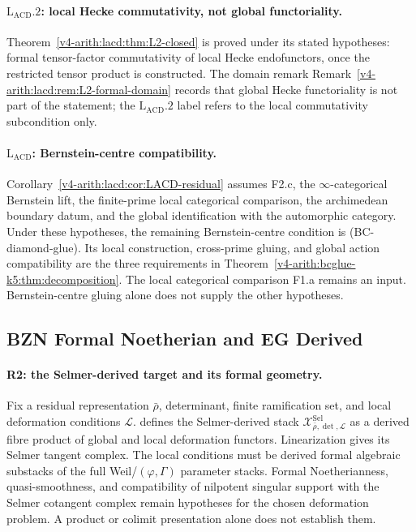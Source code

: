 \paragraph{\(\mathrm{L}_{\mathrm{ACD}}.2\): local Hecke commutativity, not global functoriality.}
Theorem~\ref{v4-arith:lacd:thm:L2-closed} is proved under its stated hypotheses: formal
tensor-factor commutativity of local Hecke endofunctors, once the
restricted tensor product is constructed. The domain remark
Remark~\ref{v4-arith:lacd:rem:L2-formal-domain} records that global Hecke
functoriality is not part of the statement; the
\(\mathrm{L}_{\mathrm{ACD}}.2\) label refers to the local
commutativity subcondition only.

\paragraph{\(\mathrm{L}_{\mathrm{ACD}}\): Bernstein-centre compatibility.}
Corollary~\ref{v4-arith:lacd:cor:LACD-residual} assumes F2.c, the
\(\infty\)-categorical Bernstein lift, the finite-prime local
categorical comparison, the archimedean boundary datum, and the
global identification with the automorphic category.
Under these hypotheses, the remaining Bernstein-centre condition
is (BC-diamond-glue). Its local construction, cross-prime gluing,
and global action compatibility are the three requirements in
Theorem~\ref{v4-arith:bcglue-k5:thm:decomposition}.
The local categorical comparison F1.a remains an input.
Bernstein-centre gluing alone does not supply the other hypotheses.

\subsection{BZN Formal Noetherian and EG Derived}
\label{v4-arith:w3-comparison-A:ch32}

\paragraph{R2: the Selmer-derived target and its formal geometry.}
Fix a residual representation \(\bar\rho\), determinant, finite
ramification set, and local deformation conditions \(\mathcal L\).
 defines the Selmer-derived
stack \(\mathcal X^{\mathrm{Sel}}_{\bar\rho,\det,\mathcal L}\)
as a derived fibre product of global and local deformation functors.
Linearization gives its Selmer tangent complex.
The local conditions must be derived formal algebraic substacks
of the full Weil/\((\varphi,\Gamma)\) parameter stacks.
Formal Noetherianness, quasi-smoothness, and compatibility of
nilpotent singular support with the Selmer cotangent complex
remain hypotheses for the chosen deformation problem.
A product or colimit presentation alone does not establish them.

